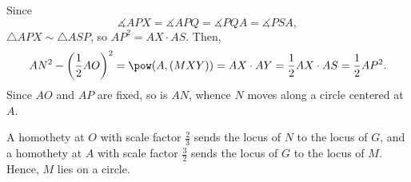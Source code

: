 Since \[\measuredangle APX=\measuredangle APQ=\measuredangle PQA=\measuredangle PSA,\]
$\triangle APX\sim\triangle ASP$, so $AP^2=AX\cdot AS$. Then, \[AN^2-\left(\frac12AO\right)^2=\pow(A,(MXY))=AX\cdot AY=\frac12AX\cdot AS=\frac12AP^2.\]
Since $AO$ and $AP$ are fixed, so is $AN$, whence $N$ moves along a circle centered at $A$.

A homothety at $O$ with scale factor $\tfrac23$ sends the locus of $N$ to the locus of $G$, and a homothety at $A$ with scale factor $\tfrac32$ sends the locus of $G$ to the locus of $M$. Hence, $M$ lies on a circle.
